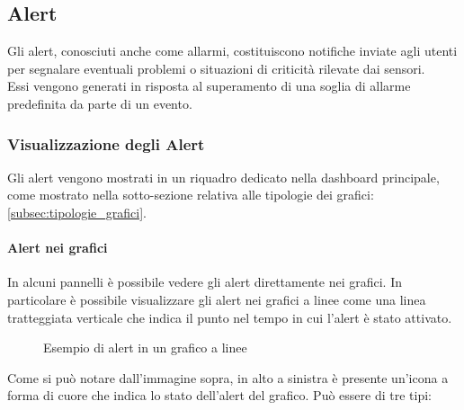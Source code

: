 \subsection{Alert}
Gli alert, conosciuti anche come allarmi, costituiscono notifiche inviate agli utenti per segnalare eventuali problemi o situazioni di criticità rilevate dai sensori.\\
Essi vengono generati in risposta al superamento di una soglia di allarme predefinita da parte di un evento.\\

\subsubsection{Visualizzazione degli Alert}
Gli alert vengono mostrati in un riquadro dedicato nella dashboard principale, come mostrato nella sotto-sezione relativa alle tipologie dei grafici: \ref{subsec:tipologie_grafici}.\\

\paragraph{Alert nei grafici}
In alcuni pannelli è possibile vedere gli alert direttamente nei grafici. In particolare è possibile visualizzare gli alert nei grafici a linee come una linea tratteggiata verticale che indica il punto nel tempo in cui l'alert è stato attivato.\\
\begin{figure}[H]
    \centering
    \caption{Esempio di alert in un grafico a linee}
    \label{fig:my_label}
\end{figure}
Come si può notare dall'immagine sopra, in alto a sinistra è presente un'icona a forma di cuore che indica lo stato dell'alert del grafico. Può essere di tre tipi:

